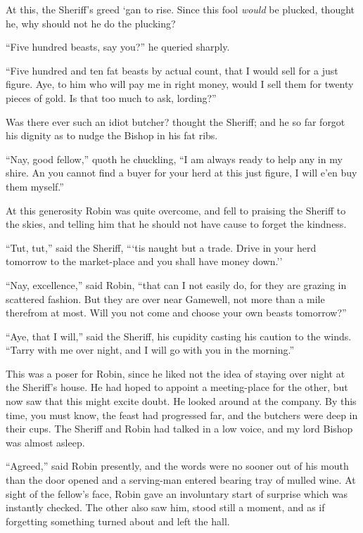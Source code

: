 At this, the Sheriff's greed `gan to rise. Since this fool \emph{would}
be plucked, thought he, why should not he do the plucking?

``Five hundred beasts, say you?'' he queried sharply.

``Five hundred and ten fat beasts by actual count, that I would sell for
a just figure. Aye, to him who will pay me in right money, would I sell
them for twenty pieces of gold. Is that too much to ask, lording?''

Was there ever such an idiot butcher? thought the Sheriff; and he so far
forgot his dignity as to nudge the Bishop in his fat ribs.

``Nay, good fellow,'' quoth he chuckling, ``I am always ready to help
any in my shire. An you cannot find a buyer for your herd at this just
figure, I will e'en buy them myself.''

At this generosity Robin was quite overcome, and fell to praising the
Sheriff to the skies, and telling him that he should not have cause to
forget the kindness.

``Tut, tut,'' said the Sheriff, ```tis naught but a trade. Drive in your
herd tomorrow to the market-place and you shall have money down.''

``Nay, excellence,'' said Robin, ``that can I not easily do, for they
are grazing in scattered fashion. But they are over near Gamewell, not
more than a mile therefrom at most. Will you not come and choose your
own beasts tomorrow?''

``Aye, that I will,'' said the Sheriff, his cupidity casting his caution
to the winds. ``Tarry with me over night, and I will go with you in the
morning.''

This was a poser for Robin, since he liked not the idea of staying over
night at the Sheriff's house. He had hoped to appoint a meeting-place
for the other, but now saw that this might excite doubt. He looked
around at the company. By this time, you must know, the feast had
progressed far, and the butchers were deep in their cups. The Sheriff
and Robin had talked in a low voice, and my lord Bishop was almost
asleep.

``Agreed,'' said Robin presently, and the words were no sooner out of
his mouth than the door opened and a serving-man entered bearing tray of
mulled wine. At sight of the fellow's face, Robin gave an involuntary
start of surprise which was instantly checked. The other also saw him,
stood still a moment, and as if forgetting something turned about and
left the hall.

